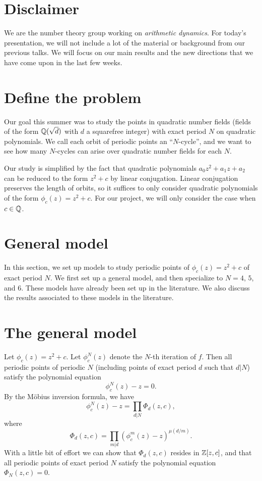 




\section{Disclaimer}
\label{sec:disc}

We are the number theory group working on \emph{arithmetic dynamics}.
For today's presentation, we will not include a lot of the 
material or background from our previous talks. We will focus on 
our main results and the new directions that we have come upon in 
the last few weeks. 

\section{Define the problem}
\label{sec:defprob}

Our goal this summer was to study the points in quadratic number 
fields (fields of the form $\mathbb{Q}(\sqrt{d})$ with $d$ a squarefree 
integer) with exact period $N$ on quadratic polynomials. We call 
each orbit of periodic points an ``$N$-cycle'', and we want to see 
how many $N$-cycles can arise over quadratic number fields for each 
$N$.

Our study is simplified by the fact that quadratic polynomials $a_0z
^2 + a_1z + a_2$ can be reduced to the form $z^2 + c$ by linear 
conjugation. Linear conjugation preserves the length of orbits, so 
it suffices to only consider quadratic polynomials of the form $\phi
_c(z) = z^2 + c$. For our project, we will only consider the case
when $c \in \mathbb{Q}$.

\section{General model}
\label{sec:model}

In this section, we set up models to study periodic points of
$\phi_c(z) = z^2 + c$ of exact period $N$. We first set up a general
model, and then specialize to $N = 4$, $5$, and $6$. These models have
already been set up in the literature. We also discuss the results
associated to these models in the literature.

\section{The general model}
\label{sec:model-general}

Let $\phi_c(z) = z^2 + c$. Let $\phi_c^N(z)$ denote the $N$-th
iteration of $f$. Then all periodic points of periodic $N$ (including
points of exact period $d$ such that $d | N$) satisfy the polynomial
equation
\[
\phi_c^N(z) - z = 0.
\]
By the M\"obius inversion formula, we have
\[
\phi_c^N(z) - z = \prod_{d|N} \Phi_d(z, c),
\]
where
\[
\Phi_d(z, c) = \prod_{m|d}(\phi_c^m(z) - z)^{\mu(d/m)}.
\]
With a little bit of effort we can show that $\Phi_d(z, c)$ resides in
$\mathbb{Z}[z, c]$, and that all periodic points of exact period $N$ satisfy
the polynomial equation $\Phi_N(z, c) = 0$.

